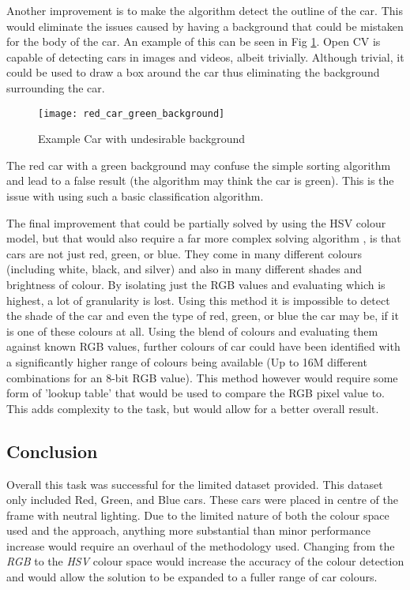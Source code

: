 \documentclass[conference]{IEEEtran}
\begin{document}
Another improvement is to make the algorithm detect the outline of the car. This would eliminate the issues caused by having a background that could be mistaken for the body of the car. An example of this can be seen in Fig \ref{fig:red_car_green_background}. Open CV is capable of detecting cars in images and videos, albeit trivially. Although trivial, it could be used to draw a box around the car thus eliminating the background surrounding the car. \cite{ref:Vehicle_detection_in_python} 

\begin{figure}
\centerline{\texttt{[image: red\_car\_green\_background]}}
\caption{Example Car with undesirable background}
\label{fig:red_car_green_background}
\end{figure}

The red car with a green background may confuse the simple sorting algorithm and lead to a false result (the algorithm may think the car is green). This is the issue with using such a basic classification algorithm.

The final improvement that could be partially solved by using the HSV colour model, but that would also require a far more complex solving algorithm \cite{ref:colour_sorting}, is that cars are not just red, green, or blue. They come in many different colours (including white, black, and silver) and also in many different shades and brightness of colour. By isolating just the RGB values and evaluating which is highest, a lot of granularity is lost. Using this method it is impossible to detect the shade of the car and even the type of red, green, or blue the car may be, if it is one of these colours at all. Using the blend of colours and evaluating them against known RGB values, further colours of car could have been identified with a significantly higher range of colours being available (Up to 16M different combinations for an 8-bit RGB value). This method however would require some form of 'lookup table' that would be used to compare the RGB pixel value to. This adds complexity to the task, but would allow for a better overall result.

\subsection{Conclusion}

Overall this task was successful for the limited dataset provided. This dataset only included Red, Green, and Blue cars. These cars were placed in centre of the frame with neutral lighting. Due to the limited nature of both the colour space used and the approach, anything more substantial than minor performance increase would require an overhaul of the methodology used. Changing from the \textit{RGB} to the \textit{HSV} colour space would increase the accuracy of the colour detection and would allow the solution to be expanded to a fuller range of car colours. 
\end{document}
